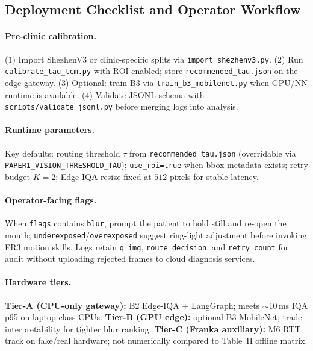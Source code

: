 \subsection{Deployment Checklist and Operator Workflow}
\label{sec:deploy-checklist}

\paragraph{Pre-clinic calibration.}
(1) Import ShezhenV3 or clinic-specific splits via \texttt{import\_shezhenv3.py}.
(2) Run \texttt{calibrate\_tau\_tcm.py} with ROI enabled; store \texttt{recommended\_tau.json} on the edge gateway.
(3) Optional: train B3 via \texttt{train\_b3\_mobilenet.py} when GPU/NN runtime is available.
(4) Validate JSONL schema with \texttt{scripts/validate\_jsonl.py} before merging logs into analysis.

\paragraph{Runtime parameters.}
Key defaults: routing threshold $\tau$ from \texttt{recommended\_tau.json} (overridable via \texttt{PAPER1\_VISION\_THRESHOLD\_TAU}); \texttt{use\_roi=true} when bbox metadata exists; retry budget $K{=}2$; Edge-IQA resize fixed at $512$ pixels for stable latency.

\paragraph{Operator-facing flags.}
When \texttt{flags} contains \texttt{blur}, prompt the patient to hold still and re-open the mouth; \texttt{underexposed}/\texttt{overexposed} suggest ring-light adjustment before invoking FR3 motion skills.
Logs retain \texttt{q\_img}, \texttt{route\_decision}, and \texttt{retry\_count} for audit without uploading rejected frames to cloud diagnosis services.

\paragraph{Hardware tiers.}
\textbf{Tier-A (CPU-only gateway):} B2 Edge-IQA + LangGraph; meets $\sim$10\,ms IQA p95 on laptop-class CPUs.
\textbf{Tier-B (GPU edge):} optional B3 MobileNet; trade interpretability for tighter blur ranking.
\textbf{Tier-C (Franka auxiliary):} M6 RTT track on fake/real hardware; not numerically compared to Table~II offline matrix.

